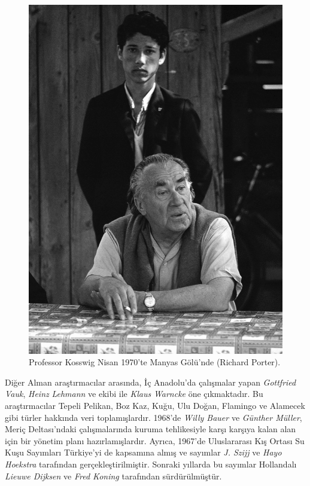 \documentclass[
  a4paper,
  DIV=11,
  numbers=noendperiod]{scrreprt}
\begin{document}
\begin{figure}[H]

{\centering \includegraphics[width=6.25in,height=\textheight]{images/Cosswig.gif}

}

\caption{Professor Kosswig Nisan 1970'te Manyas Gölü'nde (Richard
Porter).}

\end{figure}%

Diğer Alman araştırmacılar arasında, İç Anadolu'da çalışmalar yapan
\emph{Gottfried Vauk}, \emph{Heinz} \emph{Lehmann} ve ekibi ile
\emph{Klaus} \emph{Warncke} öne çıkmaktadır. Bu araştırmacılar Tepeli
Pelikan, Boz Kaz, Kuğu, Ulu Doğan, Flamingo ve Alamecek gibi türler
hakkında veri toplamışlardır. 1968'de \emph{Willy Bauer} ve
\emph{Günther Müller}, Meriç Deltası'ndaki çalışmalarında kuruma
tehlikesiyle karşı karşıya kalan alan için bir yönetim planı
hazırlamışlardır. Ayrıca, 1967'de Uluslararası Kış Ortası Su Kuşu
Sayımları Türkiye'yi de kapsamına almış ve sayımlar \emph{J. Szijj} ve
\emph{Hayo Hoekstra} tarafından gerçekleştirilmiştir. Sonraki yıllarda
bu sayımlar Hollandalı \emph{Lieuwe Dijksen} ve \emph{Fred Koning}
tarafından sürdürülmüştür.
\end{document}
